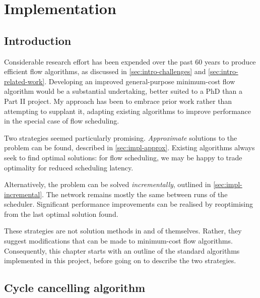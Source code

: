 \chapter{Implementation} \label{chap:impl}


\section{Introduction}


Considerable research effort has been expended over the past 60 years to produce efficient flow algorithms, as discussed in \cref{sec:intro-challenges} and \cref{sec:intro-related-work}. Developing an improved general-purpose minimum-cost flow algorithm would be a substantial undertaking, better suited to a PhD than a Part II project. My approach has been to embrace prior work rather than attempting to supplant it, adapting existing algorithms to improve performance in the special case of flow scheduling.

Two strategies seemed particularly promising. \emph{Approximate} solutions to the problem can be found, described in \cref{sec:impl-approx}. Existing algorithms always seek to find optimal solutions: for flow scheduling, we may be happy to trade optimality for reduced scheduling latency. 

Alternatively, the problem can be solved \emph{incrementally}, outlined in \cref{sec:impl-incremental}. The network remains mostly the same between runs of the scheduler. Significant performance improvements can be realised by reoptimising from the last optimal solution found.

These strategies are not solution methods in and of themselves. Rather, they suggest modifications that can be made to minimum-cost flow algorithms. Consequently, this chapter starts with an outline of the standard algorithms implemented in this project, before going on to describe the two strategies.


\section{Cycle cancelling algorithm} \label{sec:impl-cycle-cancelling}

